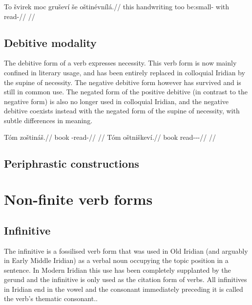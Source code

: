 \pex
\begingl
\gla To švirek moc gruševí še oštinévnílá.//
\glb this handwriting too be:small- with read-//
\glft {}//
\endgl
\xe

\subsection{Debitive modality}

The debitive form of a verb expresses necessity. This verb form is now mainly confined in literary usage, and has been entirely replaced in colloquial Iridian by the supine of necessity. The negative debitive form however has survived and is still in common use. The negated form of the positive debitive (in contrast to the negative form) is also no longer used in colloquial Iridian, and the negative debitive coexists instead with the negated form of the supine of necessity, with subtle differences in meaning.

\begin{multicols}{2}
  \pex
  \a
  \begingl
  \gla Tóm zoštináš.//
  \glb book \Neg{}-read-\SupN{}//
  \glft {}//
  \endgl
  \a \begingl
  \gla Tóm oštniškeví.//
  \glb book read-\Pv{}-\Deb{}-\Cont{}//
  \glft {}//
  \endgl
  \xe
\end{multicols}

\subsection{Periphrastic constructions}

\section{Non-finite verb forms}

\subsection{Infinitive}\label{sec:infinitive}

The {\cscaps infinitive} is a fossilised verb form that was used in Old Iridian (and arguably in Early Middle Iridian) as a verbal noun occupying the topic position in a sentence. In Modern Iridian this use has been completely supplanted by the gerund and the infinitive is only used as the citation form of verbs. All infinitives in Iridian end in the vowel  and the consonant immediately preceding it is called the verb's thematic consonant..

